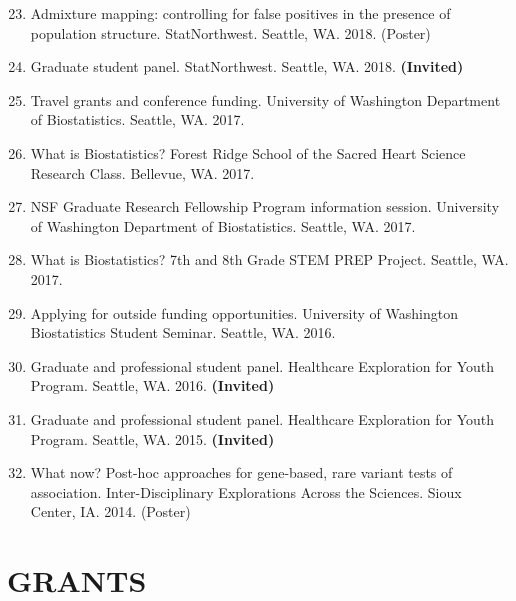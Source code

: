 \documentclass[margin]{res}
\newenvironment{benumerate}[1]{
    \let\oldItem\item
    \def\item{\addtocounter{enumi}{-2}\oldItem}
    
    \begin{enumerate}
    \setcounter{enumi}{#1}
    \addtocounter{enumi}{1}
}{
    \end{enumerate}
}
\begin{document}
\begin{resume}
\begin{benumerate}{22}
\item %
Admixture mapping: controlling for false positives in the presence of population structure. StatNorthwest. Seattle, WA. 2018. (Poster)

\item Graduate student panel. StatNorthwest. Seattle, WA. 2018. \textbf{(Invited)}

\item %
Travel grants and conference funding. University of Washington Department of Biostatistics. Seattle, WA. 2017.

\item %
What is Biostatistics? Forest Ridge School of the Sacred Heart Science Research Class. Bellevue, WA. 2017.

\item %
NSF Graduate Research Fellowship Program information session. University of Washington Department of Biostatistics. Seattle, WA. 2017.

\item %
What is Biostatistics? 7th and 8th Grade STEM PREP Project. Seattle, WA. 2017. %

\item %
Applying for outside funding opportunities. University of Washington Biostatistics Student Seminar. Seattle, WA. 2016.

\item Graduate and professional student panel. Healthcare Exploration for Youth Program. Seattle, WA. 2016. \textbf{(Invited)}

\item Graduate and professional student panel. Healthcare Exploration for Youth Program. Seattle, WA. 2015. \textbf{(Invited)}

\item %
What now? Post-hoc approaches for gene-based, rare variant tests of association. Inter-Disciplinary Explorations Across the Sciences. Sioux Center, IA. 2014.  (Poster)\\
\end{benumerate}

\section{GRANTS}


\end{resume}
\end{document}

